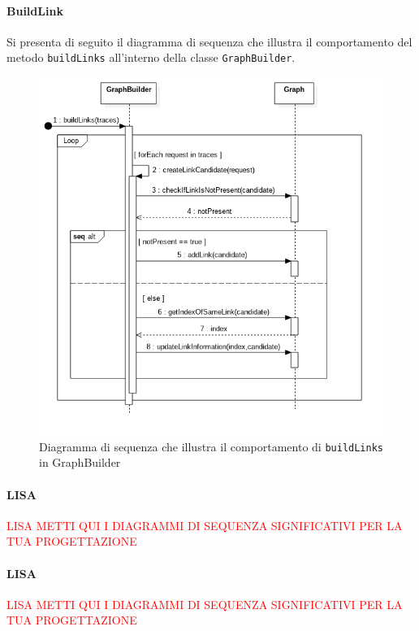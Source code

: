 \paragraph{BuildLink} \Spazio
Si presenta di seguito il diagramma di sequenza che illustra il comportamento del metodo \texttt{buildLinks} all'interno della classe \texttt{GraphBuilder}.
\begin{figure}[H]
	\centering
	\includegraphics[width=1\textwidth]{Images/SequenceBuildLinks.png}
	\caption{Diagramma di sequenza che illustra il comportamento di \texttt{buildLinks} in GraphBuilder}
	\label{img:sequenceBuildLinks}
\end{figure}

\paragraph{LISA}
\textcolor{red}{LISA METTI QUI I DIAGRAMMI DI SEQUENZA SIGNIFICATIVI PER LA TUA PROGETTAZIONE}
\paragraph{LISA}
\textcolor{red}{LISA METTI QUI I DIAGRAMMI DI SEQUENZA SIGNIFICATIVI PER LA TUA PROGETTAZIONE}












